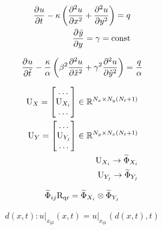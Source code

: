 \begin{align}
    \deriv{u}{t} - \kappa \left(\deriv[2]{u}{x} + \deriv[2]{u}{y} \right) = q \\
    \deriv{\check{y}}{y} = \gamma = \text{const}
\end{align}

\begin{equation}
    \deriv{u}{\check{t}} - \frac{\kappa }{\alpha} \left(
        \beta^2 \deriv[2]{u}{\check{x}} + \gamma^2 \deriv[2]{u}{\check{y}}
        \right) = \frac{q}{\alpha}
\end{equation}

\begin{align}
    \matr{U}_{X} = \begin{bmatrix}
        \dots \\
        \matr{U}_{X_i}\\
         \dots
    \end{bmatrix}
    \in \mathbb{R}^{N_x \times N_y (N_{t}+1)} \\
    \matr{U}_{Y} = \begin{bmatrix}
        \dots \\
        \matr{U}_{Y_j}\\
         \dots
    \end{bmatrix}
    \in \mathbb{R}^{N_y \times N_x (N_{t}+1)} \\
    \matr{U}_{X_i} \rightarrow \widetilde{\Phi}_{X_i} \\
    \matr{U}_{Y_j} \rightarrow \widetilde{\Phi}_{Y_j}
\end{align}

\begin{align}
    \widetilde{\Phi}_{ij} \matr{R}_\text{qr}
    = \widetilde{\Phi}_{X_i} \otimes \widetilde{\Phi}_{Y_j} \\
\end{align}

\begin{align}
    d(x,t) : \left. u \right\vert_{x_{q2}}(x,t) = \left. u \right\vert_{x_{q1}}(d(x,t),t)
\end{align}

